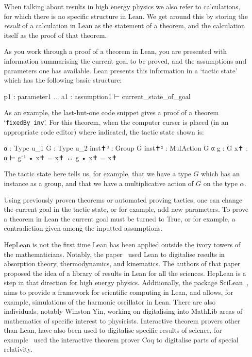 \documentclass[a4paper, 11pt]{article}
\begin{document}
When talking about results in  high energy physics  we also refer to calculations, for which there is no specific structure in Lean. We get around this by storing the \emph{result} of a calculation in Lean as the statement of a theorem, and the calculation itself as the proof of that theorem.


As you
work through a proof of a theorem in Lean, you are presented  with  information summarising the current goal to be proved, and the assumptions and parameters one has available. Lean presents this information in a `tactic state' which has the following basic structure:
\begin{code}
p1 : parameter1 
...
a1 : assumption1 
⊢ current_state_of_goal
\end{code}
As an example, the last-but-one code snippet gives a proof of a theorem `\lstinline|fixedBy_inv|'. For this theorem, when the computer curser is placed (in an appropriate code editor) where indicated, the tactic state shown is:
\begin{code}
α : Type u_1
G : Type u_2
inst✝³ : Group G
inst✝² : MulAction G α
g : G
x✝ : α
⊢ g⁻¹ • x✝ = x✝ ↔ g • x✝ = x✝
\end{code}
 The tactic state here tells us, for example, that we have a type $G$ which has an
instance as a group, and that we have a multiplicative action of $G$ on the type $\alpha$. 

Using previously proven theorems or automated proving tactics, one can change the current goal in the tactic state, or for example, add new parameters. To prove a theorem in Lean the current goal must be turned to True, or for example, a contradiction given among the inputted assumptions.

 
HepLean is not the first time Lean has been applied outside the
 ivory towers of the mathematicians. Notably, the paper~\cite{josephson} used Lean to digitalise
 results in absorption theory, thermodynamics, and kinematics. The authors of that paper proposed the
 idea of a library of results in Lean for all the sciences. HepLean is a step in that direction for
 high energy physics. Additionally, the package SciLean~\cite{SciLean}, aims to provide a framework for scientific computing in Lean, and allows, for example, simulations of the harmonic oscillator in Lean. There are also individuals,  notably Winston Yin, working on digitalising into MathLib areas of mathematics of specific interest to physicists.
 Interactive theorem provers other than Lean, have also been used to digitalise
 specific results of science,  for example~\cite{lu2017formalization} used the
 interactive theorem prover Coq to digitalise parts of  special relativity.
 
\end{document}
